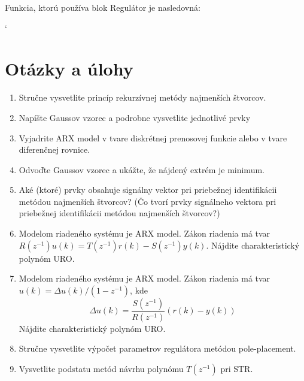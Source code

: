 \documentclass[a4paper, 10pt, ]{article}
\begin{document}
\noindent
Funkcia, ktorú používa blok Regulátor je nasledovná:

{\catcode`

}














\section{Otázky a úlohy}



\begin{enumerate}[leftmargin=0pt, labelsep=4mm, itemsep=0pt]

	\item Stručne vysvetlite princíp rekurzívnej metódy najmenších štvorcov.

	\item Napíšte Gaussov vzorec a podrobne vysvetlite jednotlivé prvky

	\item Vyjadrite ARX model v tvare diskrétnej prenosovej funkcie alebo v tvare diferenčnej rovnice.

	\item Odvoďte Gaussov vzorec a ukážte, že nájdený extrém je minimum.

	\item Aké (ktoré) prvky obsahuje signálny vektor pri priebežnej identifikácii metódou najmenších štvorcov? (Čo tvorí prvky signálneho vektora pri priebežnej identifikácii metódou najmenších štvorcov?)




	\item Modelom riadeného systému je ARX model. Zákon riadenia má tvar $R(z^{-1}) u(k) =  T(z^{-1}) r(k) -  S(z^{-1}) y(k)$. Nájdite charakteristický polynóm URO.

	\item Modelom riadeného systému je ARX model. Zákon riadenia má tvar $ u(k) =  \Delta u(k) / (1 - z^{-1})$, kde
	\begin{equation*}
		\Delta u(k) = \frac{S(z^{-1})}{R(z^{-1})} (r(k) - y(k))
	\end{equation*}
		Nájdite charakteristický polynóm URO.

	\item Stručne vysvetlite výpočet parametrov regulátora metódou pole-placement.

	\item Vysvetlite podstatu metód návrhu polynómu $T(z^{-1})$ pri STR.


\end{enumerate}
\end{document}
